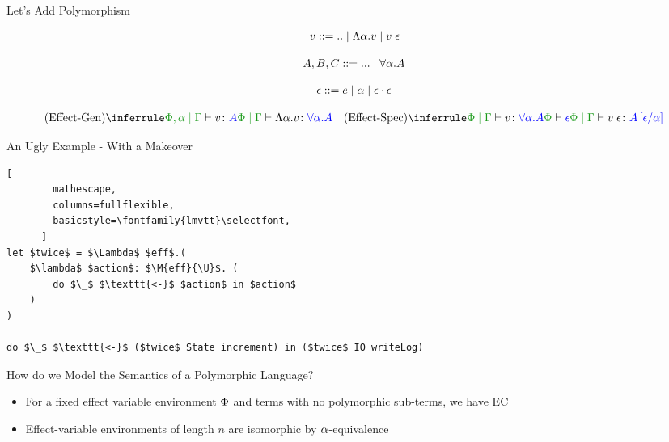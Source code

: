 \documentclass{beamer}
\newcommand\script[1]{}
\begin{document}
\begin{frame}{Let's Add Polymorphism}
   
\begin{align*}
    v::=\text{..}\mid\elam{\a}{v}\mid\eapp{v}{\e}
\end{align*}

\begin{align*}
    A, B, C::=\text{...}\mid \all{\a}{A}
\end{align*}

\begin{align*}
    \e ::= e \mid \a \mid \e\dot\e
\end{align*}

    \[
        \ntreeruleI{Effect-Gen}{\etyperelation{\P,\a}{\G}{v}{A}}{\gpetyperelation{\elam{\a}{v}}{\all{\a}{A}}}
        \quad
        \ntreeruleII{Effect-Spec}{\gpetyperelation{v}{\all{\a}A}}{\wellformed{\P}{\e}}{\gpetyperelation{\eapp{v}{\e}}{A\ssub{\a}{\e}}}    
    \]
    \script{
        - Let's now add some polymorphism syntax to EC.
        - This gives us the polymorphic effect calculus.
        - Notice now that in our type rules, we now have an effect-variable environment. Important later
    }
\end{frame}

\begin{frame}[fragile]{An Ugly Example - With a Makeover}
    \begin{lstlisting}[
        mathescape,
        columns=fullflexible,
        basicstyle=\fontfamily{lmvtt}\selectfont,
      ]
let $twice$ = $\Lambda$ $eff$.(
    $\lambda$ $action$: $\M{eff}{\U}$. (
        do $\_$ $\texttt{<-}$ $action$ in $action$
    )
)

do $\_$ $\texttt{<-}$ ($twice$ State increment) in ($twice$ IO writeLog)
    \end{lstlisting}
    \script{
        - We've now added polymorphism, which makes our ugly program more concise.
        - We can reuse this function
    }
\end{frame}

\begin{frame}{How do we Model the Semantics of a Polymorphic Language?}

    \begin{itemize}
        \item For a fixed effect variable environment $\P$ and terms with no polymorphic sub-terms, we have EC
        \item Effect-variable environments of length $n$ are isomorphic by $\a$-equivalence
    \end{itemize}
    
    

    \script{
        - If we fix the effect-variable environment, and disallow polymorphic terms, then PEC terms become EC terms for a particular instantiation.
        - We already know how to build models for PEC
        -It's also the case that effect-variable environments can type the same set of relations, upto alpha equivalence.
        - So there is a countable set of these EC instantiations
    }
\end{frame}
\end{document}
